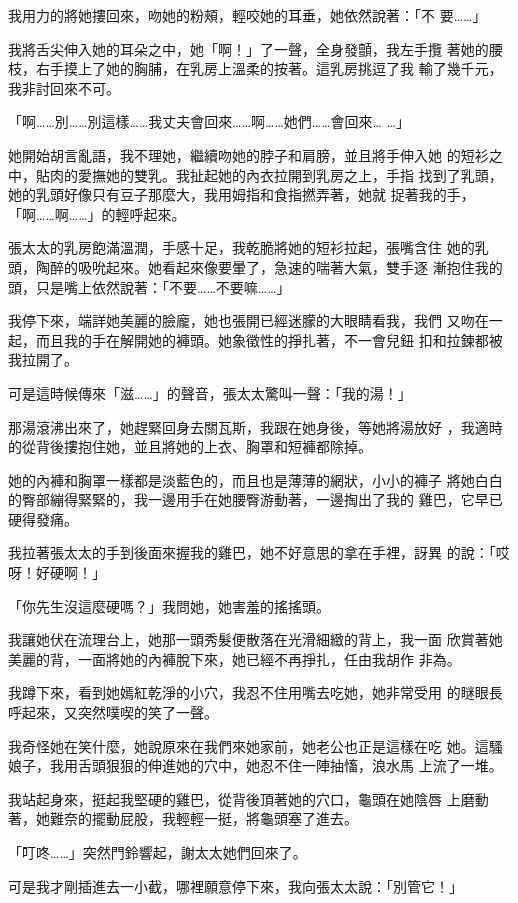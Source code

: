 我用力的將她摟回來，吻她的粉頰，輕咬她的耳垂，她依然說著：「不
要……」

我將舌尖伸入她的耳朵之中，她「啊！」了一聲，全身發顫，我左手攬
著她的腰枝，右手摸上了她的胸脯，在乳房上溫柔的按著。這乳房挑逗了我
輸了幾千元，我非討回來不可。

「啊……別……別這樣……我丈夫會回來……啊……她們……會回來…
…」

她開始胡言亂語，我不理她，繼續吻她的脖子和肩膀，並且將手伸入她
的短衫之中，貼肉的愛撫她的雙乳。我扯起她的內衣拉開到乳房之上，手指
找到了乳頭，她的乳頭好像只有豆子那麼大，我用姆指和食指撚弄著，她就
捉著我的手，「啊……啊……」的輕呼起來。

張太太的乳房飽滿溫潤，手感十足，我乾脆將她的短衫拉起，張嘴含住
她的乳頭，陶醉的吸吮起來。她看起來像要暈了，急速的喘著大氣，雙手逐
漸抱住我的頭，只是嘴上依然說著：「不要……不要嘛……」

我停下來，端詳她美麗的臉龐，她也張開已經迷朦的大眼睛看我，我們
又吻在一起，而且我的手在解開她的褲頭。她象徵性的掙扎著，不一會兒鈕
扣和拉鍊都被我拉開了。

可是這時候傳來「滋……」的聲音，張太太驚叫一聲：「我的湯！」

那湯滾沸出來了，她趕緊回身去關瓦斯，我跟在她身後，等她將湯放好
，我適時的從背後摟抱住她，並且將她的上衣、胸罩和短褲都除掉。

她的內褲和胸罩一樣都是淡藍色的，而且也是薄薄的網狀，小小的褲子
將她白白的臀部繃得緊緊的，我一邊用手在她腰臀游動著，一邊掏出了我的
雞巴，它早已硬得發痛。

我拉著張太太的手到後面來握我的雞巴，她不好意思的拿在手裡，訝異
的說：「哎呀！好硬啊！」

「你先生沒這麼硬嗎？」我問她，她害羞的搖搖頭。

我讓她伏在流理台上，她那一頭秀髮便散落在光滑細緻的背上，我一面
欣賞著她美麗的背，一面將她的內褲脫下來，她已經不再掙扎，任由我胡作
非為。

我蹲下來，看到她嫣紅乾淨的小穴，我忍不住用嘴去吃她，她非常受用
的瞇眼長呼起來，又突然噗喫的笑了一聲。

我奇怪她在笑什麼，她說原來在我們來她家前，她老公也正是這樣在吃
她。這騷娘子，我用舌頭狠狠的伸進她的穴中，她忍不住一陣抽慉，浪水馬
上流了一堆。

我站起身來，挺起我堅硬的雞巴，從背後頂著她的穴口，龜頭在她陰唇
上磨動著，她難奈的擺動屁股，我輕輕一挺，將龜頭塞了進去。

「叮咚……」突然門鈴響起，謝太太她們回來了。

可是我才剛插進去一小截，哪裡願意停下來，我向張太太說：「別管它！」


